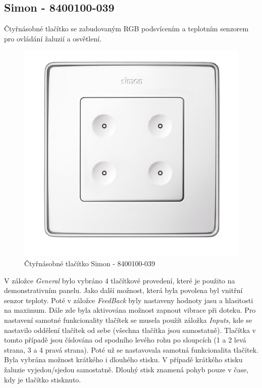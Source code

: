 \subsection{Simon - 8400100-039}
Čtyřnásobné tlačítko se zabudovaným RGB podsvícením a teplotním senzorem pro ovládání žaluzií a osvětlení. \cite{Simon}

\begin{figure}[!ht]
  \begin{center}
    \includegraphics[scale=0.4]{obrazky/Simon.png}
  \end{center}
  \caption[Čtyřnásobné tlačítko Simon - 8400100-039 \cite{Simon}]{Čtyřnásobné tlačítko Simon - 8400100-039 \cite{Simon}}
  \label{fig:Čtyřnásobné tlačítko Simon - 8400100-039}
\end{figure}

V záložce \textit{General} bylo vybráno 4 tlačítkové provedení, které je použito na demonstrativním panelu. Jako další možnost, která byla povolena byl vnitřní senzor teploty. Poté v záložce \textit{FeedBack} byly nastaveny hodnoty jasu a hlasitosti na maximum. Dále zde byla aktivována možnost zapnout vibrace při doteku. Pro nastavení samotné funkcionality tlačítek se musela použít záložka \textit{Inputs}, kde se nastavilo oddělení tlačítek od sebe (všechna tlačítka jsou samostatně). Tlačítka v tomto případě jsou číslována od spodního levého rohu po sloupcích (1 a 2 levá strana, 3 a 4 pravá strana). Poté už se nastavovala samotná funkcionalita tlačítek. Byla vybrána možnost krátkého i dlouhého stisku. V případě krátkého stisku žaluzie vyjedou/sjedou samostatně. Dlouhý stisk znamená pohyb pouze v čase, kdy je tlačítko stisknuto.


